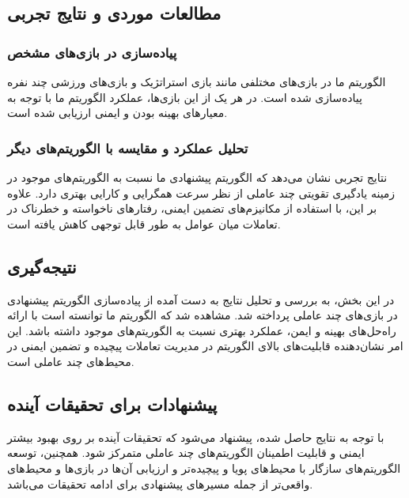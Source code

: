 \subsection{مطالعات موردی و نتایج تجربی}
\subsubsection{پیاده‌سازی در بازی‌های مشخص}
الگوریتم ما در بازی‌های مختلفی مانند بازی استراتژیک  و بازی‌های ورزشی چند نفره پیاده‌سازی شده است. در هر یک از این بازی‌ها، عملکرد الگوریتم ما با توجه به معیارهای بهینه بودن و ایمنی ارزیابی شده است.

\subsubsection{تحلیل عملکرد و مقایسه با الگوریتم‌های دیگر}
نتایج تجربی نشان می‌دهد که الگوریتم پیشنهادی ما نسبت به الگوریتم‌های موجود در زمینه یادگیری تقویتی چند عاملی از نظر سرعت همگرایی و کارایی بهتری دارد. علاوه بر این، با استفاده از مکانیزم‌های تضمین ایمنی، رفتارهای ناخواسته و خطرناک در تعاملات میان عوامل به طور قابل توجهی کاهش یافته است.

\subsection{نتیجه‌گیری}
در این بخش، به بررسی و تحلیل نتایج به دست آمده از پیاده‌سازی الگوریتم پیشنهادی در بازی‌های چند عاملی پرداخته شد. مشاهده شد که الگوریتم ما توانسته است با ارائه راه‌حل‌های بهینه و ایمن، عملکرد بهتری نسبت به الگوریتم‌های موجود داشته باشد. این امر نشان‌دهنده قابلیت‌های بالای الگوریتم در مدیریت تعاملات پیچیده و تضمین ایمنی در محیط‌های چند عاملی است.

\subsection{پیشنهادات برای تحقیقات آینده}
با توجه به نتایج حاصل شده، پیشنهاد می‌شود که تحقیقات آینده بر روی بهبود بیشتر ایمنی و قابلیت اطمینان الگوریتم‌های چند عاملی متمرکز شود. همچنین، توسعه الگوریتم‌های سازگار با محیط‌های پویا و پیچیده‌تر و ارزیابی آن‌ها در بازی‌ها و محیط‌های واقعی‌تر از جمله مسیرهای پیشنهادی برای ادامه تحقیقات می‌باشد.

